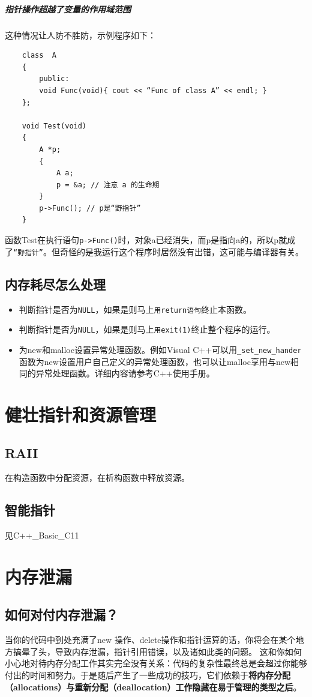 \documentclass[UTF8,a4paper,12pt]{ctexbook}
\begin{document}
			
			\subparagraph{指针操作超越了变量的作用域范围}
				这种情况让人防不胜防，示例程序如下：
				\begin{lstlisting}
	class  A
	{
		public:
		void Func(void){ cout << “Func of class A” << endl; }
	};
	
	void Test(void)
	{	
		A *p;	
		{			
			A a;			
			p = &a; // 注意 a 的生命期
		}
		p->Func(); // p是“野指针”
	}
				\end{lstlisting}
				函数Test在执行语句\verb|p->Func()|时，对象a已经消失，而p是指向a的，所以p就成了\verb|“野指针”|。但奇怪的是我运行这个程序时居然没有出错，这可能与编译器有关。

		\subsection{内存耗尽怎么处理}
			\begin{itemize}
				\item 判断指针是否为\verb|NULL|，如果是则马上\verb|用return语句|终止本函数。
				\item 判断指针是否为\verb|NULL|，如果是则马上\verb|用exit(1)|终止整个程序的运行。
				\item 为new和malloc设置异常处理函数。例如Visual C++可以用\verb|_set_new_hander|函数为new设置用户自己定义的异常处理函数，也可以让malloc享用与new相同的异常处理函数。详细内容请参考C++使用手册。
			\end{itemize}
		

	\section{健壮指针和资源管理}
		\subsection{RAII}
			在构造函数中分配资源，在析构函数中释放资源。
		\subsection{智能指针}
			见C++\_Basic\_C11
		
		
		
	\section{内存泄漏}
		\subsection{如何对付内存泄漏？}
			当你的代码中到处充满了new 操作、delete操作和指针运算的话，你将会在某个地方搞晕了头，导致内存泄漏，指针引用错误，以及诸如此类的问题。
			这和你如何小心地对待内存分配工作其实完全没有关系：代码的复杂性最终总是会超过你能够付出的时间和努力。于是随后产生了一些成功的技巧，它们依赖于\textbf{将内存分配（allocations）与重新分配（deallocation）工作隐藏在易于管理的类型之后}。
			
\end{document}
